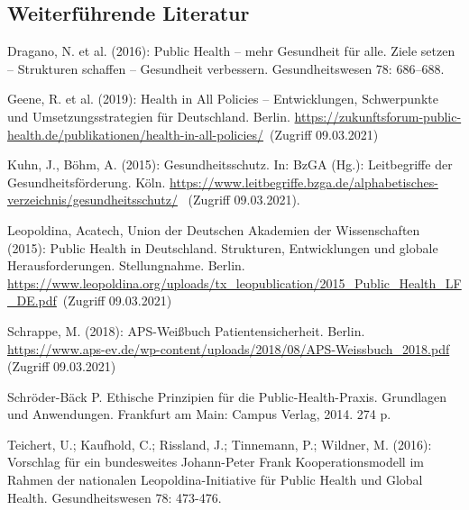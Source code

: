 \documentclass{article}
\begin{document}
\subsection{Weiterführende Literatur}\label{H8423460}



Dragano, N. et al. (2016): Public Health – mehr Gesundheit für alle. Ziele setzen – Strukturen schaffen – Gesundheit verbessern. Gesundheitswesen 78: 686–688.


Geene, R. et al. (2019): Health in All Policies – Entwicklungen, Schwerpunkte und Umsetzungsstrategien für Deutschland. Berlin. \href{https://zukunftsforum-public-health.de/publikationen/health-in-all-policies/}{https://zukunftsforum-public-health.de/publikationen/health-in-all-policies/} (Zugriff 09.03.2021)


Kuhn, J., Böhm, A. (2015): Gesundheitsschutz. In: BzGA (Hg.): Leitbegriffe der Gesundheitsförderung. Köln. \href{https://www.leitbegriffe.bzga.de/alphabetisches-verzeichnis/gesundheitsschutz/}{https://www.leitbegriffe.bzga.de/alphabetisches-verzeichnis/gesundheitsschutz/}  (Zugriff 09.03.2021).


Leopoldina, Acatech, Union der Deutschen Akademien der Wissenschaften (2015): Public Health in Deutschland. Strukturen, Entwicklungen und globale Herausforderungen. Stellungnahme. Berlin. \href{https://www.leopoldina.org/uploads/tx_leopublication/2015_Public_Health_LF_DE.pdf}{https://www.leopoldina.org/uploads/tx\_leopublication/2015\_Public\_Health\_LF\_DE.pdf} (Zugriff 09.03.2021)


Schrappe, M. (2018): APS-Weißbuch Patientensicherheit. Berlin. \href{https://www.aps-ev.de/wp-content/uploads/2018/08/APS-Weissbuch_2018.pdf}{https://www.aps-ev.de/wp-content/uploads/2018/08/APS-Weissbuch\_2018.pdf} (Zugriff 09.03.2021)


Schröder-Bäck P. Ethische Prinzipien für die Public-Health-Praxis. Grundlagen und Anwendungen. Frankfurt am Main: Campus Verlag, 2014. 274 p.


Teichert, U.; Kaufhold, C.; Rissland, J.; Tinnemann, P.; Wildner, M. (2016): Vorschlag für ein bundesweites Johann-Peter Frank Kooperationsmodell im Rahmen der nationalen Leopoldina-Initiative für Public Health und Global Health. Gesundheitswesen 78: 473-476.
\end{document}
